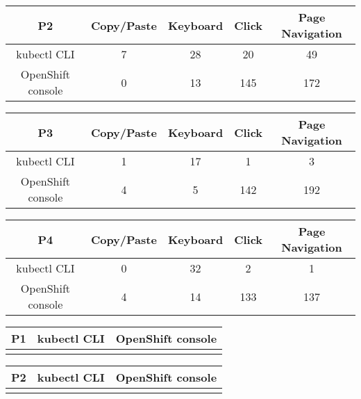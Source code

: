 \documentclass[11pt, oneside]{article}   	%
\begin{document}
\begin{center}
\begin{tabular}{ | c | c | c | c | c | } 
  \hline
  P2 & Copy/Paste & Keyboard & Click & Page Navigation \\ 
  \hline
  kubectl CLI & 7 & 28 & 20 & 49 \\ 
  \hline
  OpenShift console & 0 & 13 & 145 & 172 \\ 
  \hline
\end{tabular}
\end{center}

\begin{center}
\begin{tabular}{ | c | c | c | c | c | } 
  \hline
  P3 & Copy/Paste & Keyboard & Click & Page Navigation \\ 
  \hline
  kubectl CLI & 1 & 17 & 1 & 3 \\ 
  \hline
  OpenShift console & 4 & 5 & 142 & 192 \\ 
  \hline
\end{tabular}
\end{center}

\begin{center}
\begin{tabular}{ | c | c | c | c | c | } 
  \hline
  P4 & Copy/Paste & Keyboard & Click & Page Navigation \\ 
  \hline
  kubectl CLI & 0 & 32 & 2 & 1 \\ 
  \hline
  OpenShift console & 4 & 14 & 133 & 137 \\ 
  \hline
\end{tabular}
\end{center}

\begin{center}
\begin{tabular}{ | c | c | c | } 
  \hline
  P1 & kubectl CLI & OpenShift console \\ 
  \hline
   &  &  \\ 
  \hline
\end{tabular}
\end{center}

\begin{center}
\begin{tabular}{ | c | c | c | } 
  \hline
  P2 & kubectl CLI & OpenShift console \\ 
  \hline
   &  &  \\ 
  \hline
\end{tabular}
\end{center}
\end{document}
